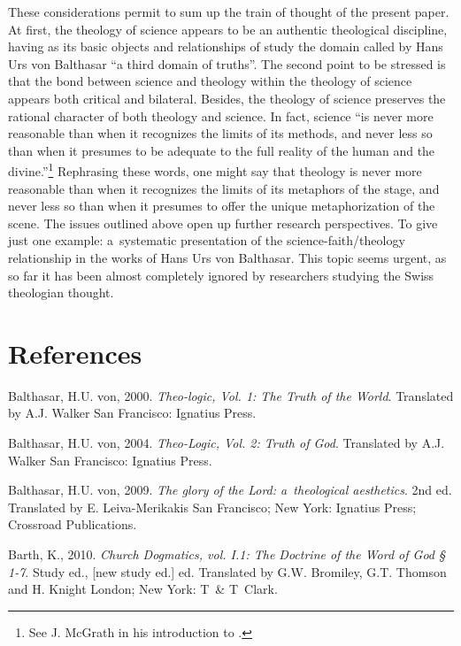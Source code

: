 These considerations permit to sum up the train of thought of the present paper. At first, the theology of science appears to be an authentic theological discipline, having as its basic objects and relationships of study the domain called by Hans Urs von Balthasar ``a third domain of truths''. The second point to be stressed is that the bond between science and theology within the theology of science appears both critical and bilateral. Besides, the theology of science preserves the rational character of both theology and science. In fact, science ``is never more reasonable than when it recognizes the limits of its methods, and never less so than when it presumes to be adequate to the full reality of the human and the divine.''\footnote{See J. McGrath in his introduction to 
\parencite[][p.5]{lococo_life_2021}. %
 } Rephrasing these words, one might say that theology is never more reasonable than when it recognizes the limits of its metaphors of the stage, and never less so than when it presumes to offer the unique metaphorization of the scene. The issues outlined above open up further research perspectives. To give just one example: a~systematic presentation of the science-faith/theology relationship in the works of Hans Urs von Balthasar. This topic seems urgent, as so far it has been almost completely ignored by researchers studying the Swiss theologian thought.



\section{References}

Balthasar, H.U. von, 2000. \textit{Theo-logic, Vol. 1: The Truth of the World}. Translated by A.J. Walker San Francisco: Ignatius Press.



Balthasar, H.U. von, 2004. \textit{Theo-Logic, Vol. 2: Truth of God}. Translated by A.J. Walker San Francisco: Ignatius Press.



Balthasar, H.U. von, 2009. \textit{The glory of the Lord: a~theological aesthetics}. 2nd ed. Translated by E. Leiva-Merikakis San Francisco; New York: Ignatius Press; Crossroad Publications.



Barth, K., 2010. \textit{Church Dogmatics, vol. I.1: The Doctrine of the Word of God § 1-7}. Study ed., [new study ed.] ed. Translated by G.W. Bromiley, G.T. Thomson and H. Knight London; New York: T~\& T~Clark.




